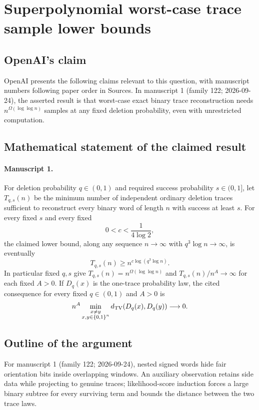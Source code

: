 \documentclass[11pt]{article}
\begin{document}
\section*{Superpolynomial worst-case trace sample lower bounds}

\subsection{OpenAI's claim}
OpenAI presents the following claims relevant to this question, with manuscript numbers following paper order in Sources. In manuscript 1 (family 122; 2026-09-24), the asserted result is that worst-case exact binary trace reconstruction needs $n^{\Omega(\log\log n)}$ samples at any fixed deletion probability, even with unrestricted computation.

\subsection{Mathematical statement of the claimed result}
\paragraph{Manuscript 1.}
For deletion probability $q\in(0,1)$ and required success probability $s\in(0,1]$, let $T_{q,s}(n)$ be the minimum number of independent ordinary deletion traces sufficient to reconstruct every binary word of length $n$ with success at least $s$. For every fixed $s$ and every fixed
\[
 0<c<\frac1{4\log2},
\]
the claimed lower bound, along any sequence $n\to\infty$ with $q^3\log n\to\infty$, is eventually
\[
 T_{q,s}(n)\ge n^{c\log(q^3\log n)}.
\]
In particular fixed $q,s$ give $T_{q,s}(n)=n^{\Omega(\log\log n)}$ and $T_{q,s}(n)/n^A\to\infty$ for each fixed $A>0$. If $D_q(x)$ is the one-trace probability law, the cited consequence for every fixed $q\in(0,1)$ and $A>0$ is
\[
 n^A\min_{\substack{x\ne y\\x,y\in\{0,1\}^n}}
             d_{\rm TV}(D_q(x),D_q(y))\longrightarrow0.
\]

\subsection{Outline of the argument}
For manuscript 1 (family 122; 2026-09-24), nested signed words hide fair orientation bits inside overlapping windows. An auxiliary observation retains side data while projecting to genuine traces; likelihood-score induction forces a large binary subtree for every surviving term and bounds the distance between the two trace laws.
\end{document}
